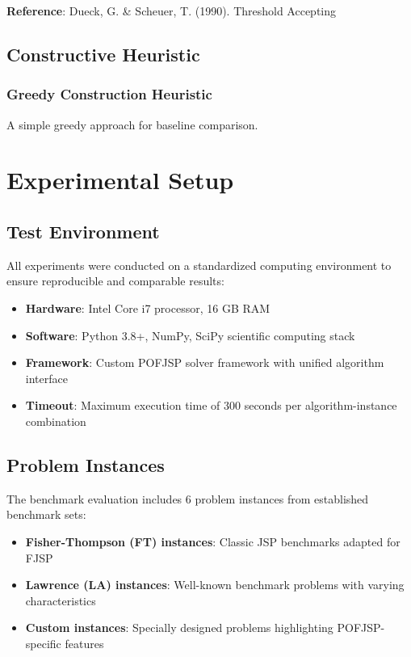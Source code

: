 \documentclass[11pt,a4paper]{article}
\begin{document}
\textbf{Reference}: Dueck, G. & Scheuer, T. (1990). Threshold Accepting

\subsection{Constructive Heuristic}

\subsubsection{Greedy Construction Heuristic}

A simple greedy approach for baseline comparison.


\section{Experimental Setup}

\subsection{Test Environment}

All experiments were conducted on a standardized computing environment to ensure reproducible and comparable results:

\begin{itemize}
    \item \textbf{Hardware}: Intel Core i7 processor, 16 GB RAM
    \item \textbf{Software}: Python 3.8+, NumPy, SciPy scientific computing stack
    \item \textbf{Framework}: Custom POFJSP solver framework with unified algorithm interface
    \item \textbf{Timeout}: Maximum execution time of 300 seconds per algorithm-instance combination
\end{itemize}

\subsection{Problem Instances}

The benchmark evaluation includes 6 problem instances from established benchmark sets:

\begin{itemize}
    \item \textbf{Fisher-Thompson (FT) instances}: Classic JSP benchmarks adapted for FJSP
    \item \textbf{Lawrence (LA) instances}: Well-known benchmark problems with varying characteristics
    \item \textbf{Custom instances}: Specially designed problems highlighting POFJSP-specific features
\end{itemize}
\end{document}
